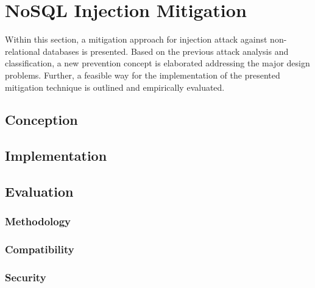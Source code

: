\chapter{NoSQL Injection Mitigation}
Within this section, a mitigation approach for injection attack against non-relational databases is presented. Based on the previous attack analysis and classification, a new prevention concept is elaborated addressing the major design problems. Further, a feasible way for the implementation of the presented mitigation technique is outlined and empirically evaluated.

\section{Conception}

\section{Implementation}

\section{Evaluation}
\label{sec:evaluation}

\subsection{Methodology}

\subsection{Compatibility}

\subsection{Security}
